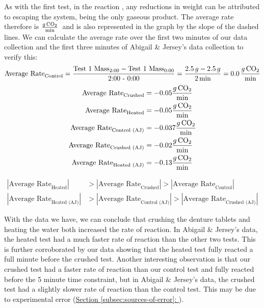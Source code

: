 As with the first test, in the reaction \reactionTwo, any reductions in weight can be attributed to  escaping the system, being the only gaseous product. The average rate therefore is $\defunits$~and is also represented in the graph by the slope of the dashed lines. We can calculate the average rate over the first two minutes of our data collection and the first three minutes of Abigail \& Jersey's data collection to verify this:
\begin{align*}
    \text{Average Rate}_{\text{Control}} &= \frac{\text{Test 1 Mass}_{2:00} - \text{Test 1 Mass}_{0:00}}{\text{2:00 - 0:00}} = \frac{2.5 \, g - 2.5 \, g}{2 \, \text{min}} = 0.0 \, \defunits \\
\end{align*}
\begin{align*}
    \text{Average Rate}_{\text{Crushed}} &= -0.05 \defunits \\
    \text{Average Rate}_{\text{Heated}} &= -0.05 \defunits \\
    \text{Average Rate}_{\text{Control (AJ)}} &= -0.037 \defunits \\
    \text{Average Rate}_{\text{Crushed (AJ)}} &= -0.02 \defunits \\
    \text{Average Rate}_{\text{Heated (AJ)}} &= -0.13 \defunits
\end{align*}

\begin{align*}
    |\text{Average Rate}_{\text{Heated}}| &> |\text{Average Rate}_{\text{Crushed}}| > |\text{Average Rate}_{\text{Control}}| \\
    |\text{Average Rate}_{\text{Heated (AJ)}}| &> |\text{Average Rate}_{\text{Control (AJ)}}| > |\text{Average Rate}_{\text{Crushed (AJ)}}|
\end{align*}

With the data we have, we can conclude that crushing the denture tablets and heating the water both increased the rate of reaction. In Abigail \& Jersey's data, the heated test had a much faster rate of reaction than the other two tests. This is further corroborated by our data showing that the heated test fully reacted a full minute before the crushed test.
Another interesting observation is that our crushed test had a faster rate of reaction than our control test and fully reacted before the 5 minute time constraint, but in Abigail \& Jersey's data, the crushed test had a slightly slower rate of reaction than the control test. This may be due to experimental error (\hyperref[subsec:sources-of-error]{Section \ref*{subsec:sources-of-error}: }).

